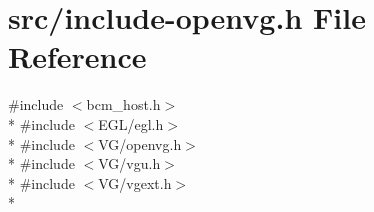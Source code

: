 \hypertarget{include-openvg_8h}{}\section{src/include-\/openvg.h File Reference}
\label{include-openvg_8h}
{\ttfamily \#include $<$bcm\+\_\+host.\+h$>$}\\*
{\ttfamily \#include $<$E\+G\+L/egl.\+h$>$}\\*
{\ttfamily \#include $<$V\+G/openvg.\+h$>$}\\*
{\ttfamily \#include $<$V\+G/vgu.\+h$>$}\\*
{\ttfamily \#include $<$V\+G/vgext.\+h$>$}\\*
